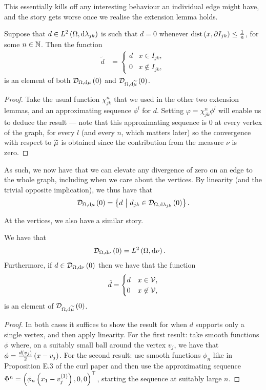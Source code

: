 \documentclass[11pt]{report}
\newcommand{\divZero}[2]{\mathcal{D}_{#1, \md #2}\bracs{0}}
\newcommand{\dist}{\mathrm{dist}}
\begin{document}
This essentially kills off any interesting behaviour an individual edge might have, and the story gets worse once we realise the extension lemma holds.
\begin{lemma}
	Suppose that $d\in L^{2}\left( \Omega,\mathrm{d}\lambda_{jk} \right)$ is such that $d=0$ whenever $\dist\bracs{x,\partial I_{jk}}\leq\recip{n}$, for some $n\in\mathbb{N}$.
	Then the function
	\begin{align*}
		\tilde{d} &= \begin{cases} d & x\in I_{jk}, \\ 0 & x\not\in I_{jk}, \end{cases}
	\end{align*}
	is an element of both $\divZero{\ddom}{\ddmes}$ and $\divZero{\ddom}{\dddmes}$.
\end{lemma}
\begin{proof}
	Take the usual function $\chi_{jk}^n$ that we used in the other two extension lemmas, and an approximating sequence $\phi^l$ for $d$.
	Setting $\varphi = \chi_{jk}^n\phi^l$ will enable us to deduce the result --- note that this approximating sequence is 0 at every vertex of the graph, for every $l$ (and every $n$, which matters later) so the convergence with respect to $\widetilde{\mu}$ is obtained since the contribution from the measure $\nu$ is zero.
\end{proof}
As such, we now have that we can elevate any divergence of zero on an edge to the whole graph, including when we care about the vertices.
By linearity (and the trivial opposite implication), we thus have that
\begin{align*}
	\divZero{\ddom}{\ddmes} = \clbracs{ d \setVert d_{jk}\in\divZero{\ddom}{\lambda_{jk}} }.
\end{align*}

At the vertices, we also have a similar story.
\begin{lemma}
	We have that
	\begin{align*}
		\divZero{\ddom}{\nu} &= \ltwo{\ddom}{\nu}.
	\end{align*}
	Furthermore, if $d\in\divZero{\ddom}{\nu}$ then we have that the function
	\begin{align*}
		\tilde{d} = \begin{cases} d & x\in\mathcal{V}, \\ 0 & x\not\in\mathcal{V}, \end{cases}
	\end{align*}
	is an element of $\divZero{\ddom}{\dddmes}$.
\end{lemma}
\begin{proof}
	In both cases it suffices to show the result for when $d$ supports only a single vertex, and then apply linearity.
	For the first result: take smooth functions $\phi$ where, on a suitably small ball around the vertex $v_j$, we have that $\phi = \frac{d(v_j)}{2}\left( x - v_j \right)$.
	For the second result: use smooth functions $\phi_n$ like in Proposition E.3 of the curl paper and then use the approximating sequence $\Phi^n = \left( \phi_n\left( x_1-v_j^{(1)} \right), 0, 0 \right)^\top$, starting the sequence at suitably large $n$.
\end{proof}
\end{document}
